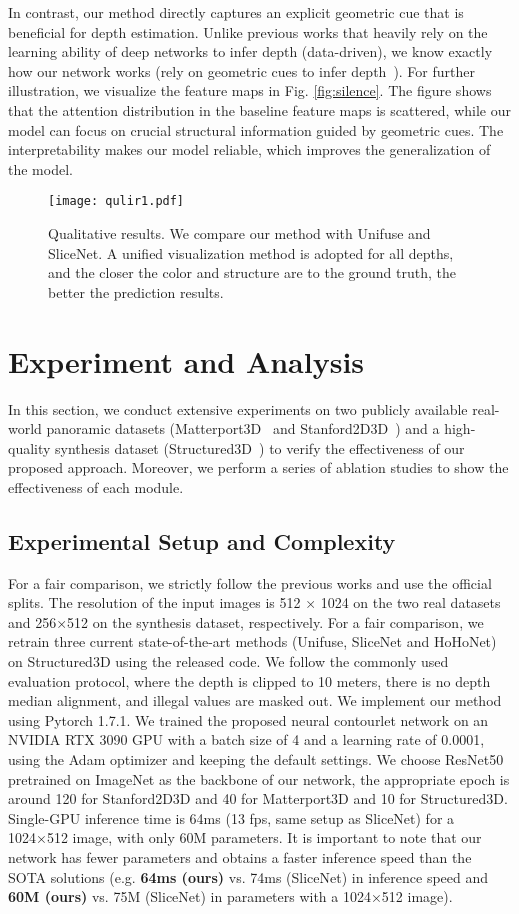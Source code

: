 \documentclass[10pt,times,mathptm,psfig,twocolumn,journals]{IEEEtran}
\begin{document}
In contrast, our method directly captures an explicit geometric cue that is beneficial for depth estimation. Unlike previous works that heavily rely on the learning ability of deep networks to infer depth (data-driven), we know exactly how our network works (rely on geometric cues to infer depth~\cite{dijk2019neural}). For further illustration, we visualize the feature maps in Fig. \ref{fig:silence}. The figure shows that the attention distribution in the baseline feature maps is scattered, while our model can focus on crucial structural information guided by geometric cues. The interpretability makes our model reliable, which improves the generalization of the model.
\begin{figure*}[t]
\centering
\texttt{[image: qulir1.pdf]}
\caption{Qualitative results. We compare our method with Unifuse\cite{Jiang_2021} and SliceNet\cite{Pintore_2021_CVPR}. A unified visualization method is adopted for all depths, and the closer the color and structure are to the ground truth, the better the prediction results.}
\label{fig:cc1}
\end{figure*}
\section{Experiment and Analysis}
\label{experiment}
In this section, we conduct extensive experiments on two publicly available real-world panoramic datasets (Matterport3D~\cite{Chang2018Matterport3D} and Stanford2D3D~\cite{DBLP:journals/corr/ArmeniSZS17}) and a high-quality synthesis dataset (Structured3D~\cite{zheng2020structured3d}) to verify the effectiveness of our proposed approach. Moreover, we perform a series of ablation studies to show the effectiveness of each module.  
 
 \subsection{Experimental Setup and Complexity}
 For a fair comparison, we strictly follow the previous works and use the official splits. The resolution of the input images is 512 × 1024 on the two real datasets and 256×512 on the synthesis dataset, respectively. For a fair comparison, we retrain three current state-of-the-art methods (Unifuse,  SliceNet and HoHoNet) on Structured3D using the released code. We follow the commonly used evaluation protocol, where the depth is clipped to 10 meters, there is no depth median alignment, and illegal values are masked out. We implement our method using Pytorch 1.7.1. We trained the proposed neural contourlet network on an NVIDIA RTX 3090 GPU with a batch size of 4 and a learning rate of 0.0001, using the Adam optimizer and keeping the default settings. We choose ResNet50 pretrained on ImageNet as the backbone of our network, the appropriate epoch is around 120 for Stanford2D3D and 40 for Matterport3D and 10 for Structured3D. Single-GPU inference time is 64ms (13 fps, same setup as SliceNet) for a 1024×512 image, with only 60M parameters. It is important to note that our network has fewer parameters and obtains a faster inference speed than the SOTA solutions (e.g. \textbf{64ms (ours)} vs. 74ms (SliceNet) in inference speed and \textbf{60M (ours)} vs. 75M (SliceNet) in parameters with a 1024×512 image).
\end{document}
